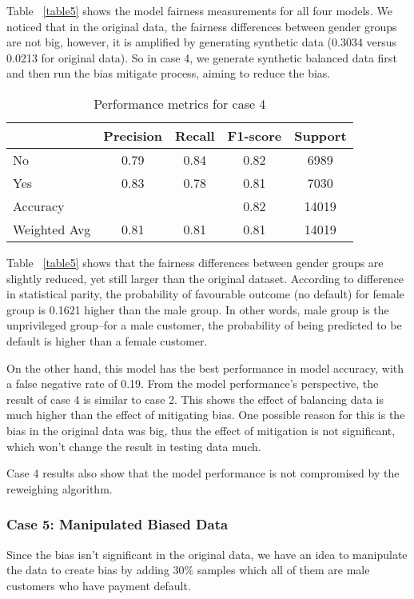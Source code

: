 \documentclass{article}
\begin{document}
Table ~\ref{table5} shows the model fairness measurements for all four models. We noticed that in the original data, the fairness differences between gender groups are not big, however, it is amplified by generating synthetic data (0.3034 versus 0.0213 for original data). So in case 4, we generate synthetic balanced data first and then run the bias mitigate process, aiming to reduce the bias. 
\begin{table}[]
  \caption{Performance metrics for case 4}
  \label{table7}
\centering
\begin{tabular}{|l|c|c|c|c|}
\hline
             &   Precision   &Recall      & F1-score     & Support      \\ \hline
No           & 0.79 & 0.84 & 0.82 & 6989  \\ \hline
Yes          & 0.83 & 0.78 & 0.81 & 7030  \\ \hline
Accuracy     &      &      & 0.82 & 14019 \\ \hline
Weighted Avg & 0.81 & 0.81 & 0.81 & 14019 \\ \hline
\end{tabular}
\end{table}
Table ~\ref{table5} shows that the fairness differences between gender groups are slightly reduced, yet still larger than the original dataset. According to difference in statistical parity, the probability of favourable outcome (no default) for female group is 0.1621 higher than the male group. In other words, male group is the unprivileged group--for a male customer, the probability of being predicted to be default is higher than a female customer.  

On the other hand, this model has the best performance in model accuracy, with a false negative rate of 0.19. From the model performance's perspective, the result of case 4 is similar to case 2. This shows the effect of balancing data is much higher than the effect of mitigating bias. One possible reason for this is the bias in the original data was big, thus the effect of mitigation is not significant, which won't change the result in testing data much. 

Case 4 results also show that the model performance is not compromised by the reweighing algorithm. 

\subsubsection{Case 5: Manipulated Biased Data}

Since the bias isn't significant in the original data, we have an idea to manipulate the data to create bias by adding 30\% samples which all of them are male customers who have payment default.
\end{document}
